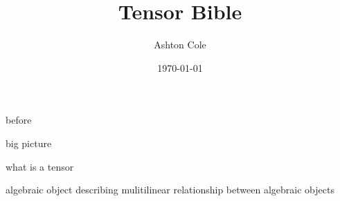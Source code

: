 \documentclass{book}
\title{Tensor Bible}
\author{Ashton Cole}
\date{\today}
\begin{document}
	
\frontmatter

\maketitle

\tableofcontents

\listoftheorems

\mainmatter



before

big picture

what is a tensor

algebraic object describing mulitilinear relationship between algebraic objects





\backmatter

\appendix


\end{document}
